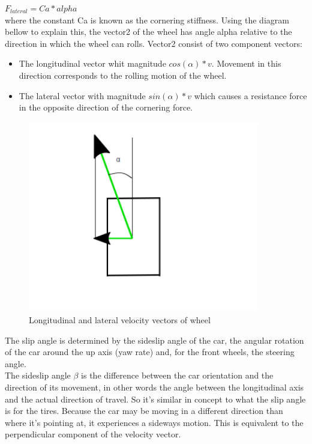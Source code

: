 \documentclass{book}
\begin{document}
$F_{lateral} = Ca * alpha $\\

where the constant Ca  is known as the cornering stiffness.
Using the diagram bellow to explain this, the vector2 of the wheel has angle alpha relative to the direction in which the wheel can rolls. Vector2 consist of two component vectors:
\begin{itemize}
    \item The longitudinal vector whit magnitude $ cos(\alpha) * v $. Movement in this direction corresponds to the rolling motion of the wheel.
    \item The lateral vector with magnitude $ sin(\alpha) * v $ which causes a resistance force in the opposite direction of the cornering force.
\end{itemize}

\begin{figure}[htbp]
  \centering
  \includegraphics[width=0.9\textwidth]{wheelongilateral}
  \caption{Longitudinal and lateral velocity vectors of wheel}
\end{figure}

The slip angle is determined by  the sideslip angle of the car, the angular rotation of the car around the up axis (yaw rate) and, for the front wheels, the steering angle.\\
The sideslip angle $\beta$ is the difference between the car orientation and the direction of its movement, in other words the angle between the longitudinal axis and the actual direction of travel. So it's similar in concept to what the slip angle is for the tires. Because the car may be moving in a different direction than where it's pointing at, it experiences a sideways motion. This is equivalent to the perpendicular component of the velocity vector.
\end{document}
